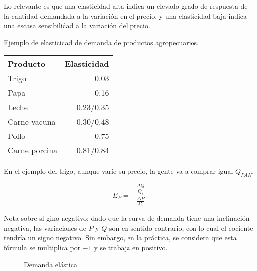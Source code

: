 Lo relevante es que una elasticidad alta indica un elevado grado de respuesta de la cantidad demandada a la variación en el precio,
y una elasticidad baja indica una escasa sensibilidad a la variación del precio.

Ejemplo de elasticidad de demanda de productos agropecuarios.

\begin{table}[h!]
    \centering
    \begin{tabular}{lr}
        \hline
        Producto      & Elasticidad \\
        \hline
        Trigo         & 0.03        \\
        Papa          & 0.16        \\
        Leche         & 0.23/0.35   \\
        Carne vacuna  & 0.30/0.48   \\
        Pollo         & 0.75        \\
        Carne porcina & 0.81/0.84   \\
        \hline
    \end{tabular}
\end{table}

En el ejemplo del trigo,
aunque varíe su precio,
la gente va a comprar igual \(Q_{PAN}\).

\begin{equation*}
    E_P = -\frac{\frac{\Delta Q}{Q_i}}{\frac{\Delta P}{P_i}}
\end{equation*}

Nota sobre sl gino negativo:
dado que la curva de demanda tiene una inclinación negativa,
las variaciones de \(P\) y \(Q\) son en sentido contrario,
con lo cual el cociente tendría un signo negativo.
Sin embargo, en la práctica, se considera que esta fórmula se multiplica por \(-1\)
y se trabaja en positivo.

\begin{figure}[h!]
    \centering
    \caption{Demanda elástica}
\end{figure}

